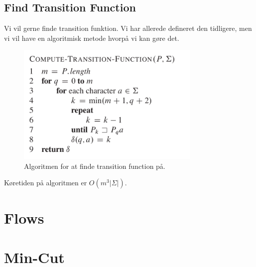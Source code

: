 \documentclass[11pt]{article}
\theoremstyle{definition}
\theoremstyle{remark}
\begin{document}
\subsection{Find Transition Function}

Vi vil gerne finde transition funktion. Vi har allerede defineret den tidligere, men vi vil have en algoritmisk metode hvorpå vi kan gøre det.


\begin{figure}[ht]
  \centering
\includegraphics[width=250pt]{compute-transition-function.png}
  \caption{\label{fig:compute-transition-function} Algoritmen for at finde transition function på.}
\end{figure}

Køretiden på algoritmen er $O(m^{3}|\Sigma|)$.



\section{Flows}
\label{sec:flows}

\section{Min-Cut}
\label{sec:mincut}
\end{document}
